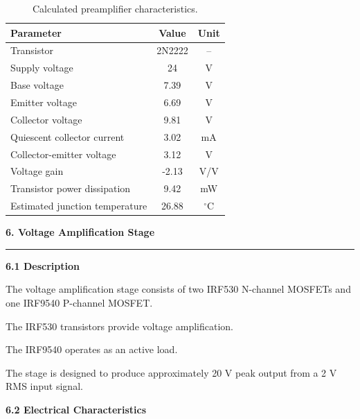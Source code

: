 \documentclass[10pt,letterpaper]{article}
\newcommand{\datasheetsection}[1]{
    \vspace{0.3cm}
    {\large\bfseries\color{datasheetblue}#1}
    \par\vspace{0.1cm}
    \hrule
    \vspace{0.15cm}
}
\newcommand{\datasheetsubsection}[1]{
    \vspace{0.15cm}
    {\normalsize\bfseries\color{datasheetblue}#1}
    \par
}
\begin{document}
\begin{table}[htbp]
\centering
\small

\begin{tabular}{p{7cm}cc}
\hline
Parameter & Value & Unit\\
\hline

Transistor & 2N2222 & --\\

Supply voltage & 24 & V\\

Base voltage & 7.39 & V\\

Emitter voltage & 6.69 & V\\

Collector voltage & 9.81 & V\\

Quiescent collector current & 3.02 & mA\\

Collector-emitter voltage & 3.12 & V\\

Voltage gain & -2.13 & V/V\\

Transistor power dissipation & 9.42 & mW\\

Estimated junction temperature & 26.88 & $^\circ$C\\

\hline
\end{tabular}

\caption{Calculated preamplifier characteristics.}
\end{table}

\datasheetsection{6. Voltage Amplification Stage}

\datasheetsubsection{6.1 Description}

The voltage amplification stage consists
of two IRF530 N-channel MOSFETs and
one IRF9540 P-channel MOSFET.

The IRF530 transistors provide
voltage amplification.

The IRF9540 operates as an active load.

The stage is designed to produce
approximately 20 V peak output
from a 2 V RMS input signal.

\datasheetsubsection{6.2 Electrical Characteristics}
\end{document}
